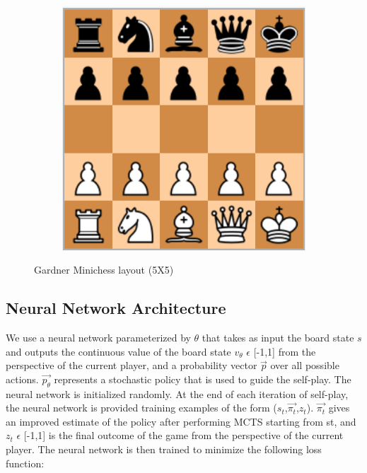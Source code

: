 \documentclass[11pt]{article}
\begin{document}
\begin{figure}[h!]
  \centering
  \begin{subfigure}[b]{0.3\linewidth}
    \includegraphics[width=\linewidth]{gardner.png}
  \end{subfigure}
  \caption{Gardner Minichess layout (5X5)}
  \label{fig:gameplay}
\end{figure}

\subsection{Neural Network Architecture}

We use a neural network parameterized by $\theta$ that takes as input the board state $s$ and outputs the continuous value of the board state $v_{\theta}$ $\epsilon$ [-1,1] from the perspective of the current player, and a probability vector $\vec{p}$ over all possible actions. $\vec{p_{\theta}}$ represents a stochastic policy that is used to guide the self-play. The neural network is initialized randomly. At the end of each iteration of self-play, the neural network is provided training examples of the form ($s_{t}$,$\vec{\pi_{t}}$,$z_{t}$). $\vec{\pi_{t}}$ gives an improved estimate of the policy after performing MCTS starting from st, and $z_{t}$ $\epsilon$ [-1,1] is the final outcome of the game from the perspective of the current player. The neural network is then trained to minimize the following loss function:
\end{document}
